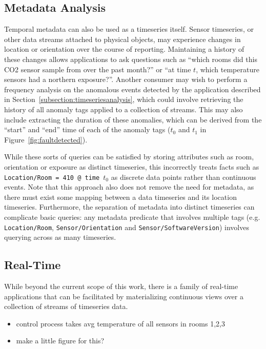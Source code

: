 \subsection{Metadata Analysis}

Temporal metadata can also be used as a timeseries itself. Sensor timeseries,
or other data streams attached to physical objects, may experience changes in
location or orientation over the course of reporting. Maintaining a history of
these changes allows applications to ask questions such as ``which rooms did
this CO2 sensor sample from over the past month?'' or ``at time $t$, which
temperature sensors had a northern exposure?''. Another consumer may wish to
perform a frequency analysis on the anomalous events detected by the
application described in Section~\ref{subsection:timeseriesanalysis}, which
could involve retrieving the history of all anomaly tags applied to a
collection of streams. This may also include extracting the duration of these
anomalies, which can be derived from the ``start'' and ``end'' time of each of
the anomaly tags ($t_0$ and $t_1$ in Figure~\ref{fig:faultdetected}).

While these sorts of queries can be satisfied by storing attributes such as
room, orientation or exposure as distinct timeseries, this incorrectly treats
facts such as \texttt{Location/Room = 410 @ time $t_0$} as discrete data points
rather than continuous events. Note that this approach also does not remove the
need for metadata, as there must exist some mapping between a data timeseries
and its location timeseries.  Furthermore, the separation of metadata into
distinct timeseries can complicate basic queries: any metadata predicate that
involves multiple tags (e.g. \texttt{Location/Room},
\texttt{Sensor/Orientation} and \texttt{Sensor/SoftwareVersion}) involves
querying across as many timeseries.

\subsection{Real-Time}

While beyond the current scope of this work, there is a family of real-time
applications that can be facilitated by materializing continuous views over a
collection of streams of timeseries data.

\begin{itemize}
\item control process takes avg temperature of all sensors in rooms 1,2,3
\item make a little figure for this?
\end{itemize}

